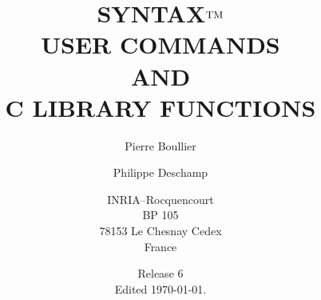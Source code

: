 \documentclass[a4paper]{report}  %
\title{
		{\huge S}YNTAX$^{\mbox{\rm \small TM}}$    \\[20pt]
		USER COMMANDS		\\
		AND			\\
		C LIBRARY FUNCTIONS
}
\author{
		Pierre Boullier
	\and
		Philippe Deschamp
	\and
		INRIA--Rocquencourt		\\
		BP 105				\\
		78153 Le Chesnay Cedex		\\
		France
}
\date{
		Release 6 \\
		Edited \today.
}
\begin{document}
\maketitle

\newpage
~
\end{document}

